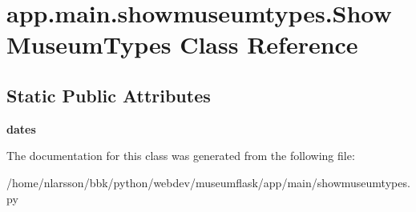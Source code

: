 \hypertarget{classapp_1_1main_1_1showmuseumtypes_1_1ShowMuseumTypes}{}\section{app.\+main.\+showmuseumtypes.\+Show\+Museum\+Types Class Reference}
\label{classapp_1_1main_1_1showmuseumtypes_1_1ShowMuseumTypes}
\subsection*{Static Public Attributes}
\begin{DoxyCompactItemize}
\item 
\mbox{\label{classapp_1_1main_1_1showmuseumtypes_1_1ShowMuseumTypes_a935b43cbcf5b05ad54c3253b58dcc5a8}} 
{\bfseries dates}
\end{DoxyCompactItemize}


The documentation for this class was generated from the following file\+:\begin{DoxyCompactItemize}
\item 
/home/nlarsson/bbk/python/webdev/museumflask/app/main/showmuseumtypes.\+py\end{DoxyCompactItemize}
